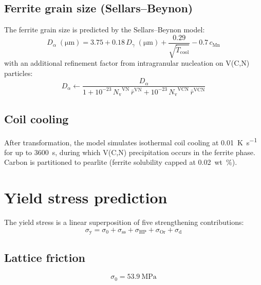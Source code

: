 \documentclass[11pt,a4paper]{article}
\newcommand{\DG}{\ensuremath{D_\gamma}}
\newcommand{\DA}{\ensuremath{D_\alpha}}
\newcommand{\sy}{\ensuremath{\sigma_\mathrm{y}}}
\newcommand{\Nv}{\ensuremath{N_\mathrm{v}}}
\begin{document}
\subsection{Ferrite grain size (Sellars--Beynon)}

The ferrite grain size is predicted by the Sellars--Beynon model:
\begin{equation}
  \DA\;(\si{\micro\metre}) = 3.75 + 0.18\,\DG\;(\si{\micro\metre})
    + \frac{0.29}{\sqrt{\dot{T}_\mathrm{cool}}}
    - 0.7\,c_\mathrm{Mn}
  \label{eq:dalpha}
\end{equation}
with an additional refinement factor from intragranular nucleation on V(C,N)
particles:
\begin{equation}
  \DA \leftarrow \frac{\DA}{1 + 10^{-23}\,\Nv^{\mathrm{VN}}\,\bar{r}^{\mathrm{VN}}
    + 10^{-23}\,\Nv^{\mathrm{VCN}}\,\bar{r}^{\mathrm{VCN}}}
  \label{eq:igr}
\end{equation}

\subsection{Coil cooling}

After transformation, the model simulates isothermal coil cooling at
\SI{0.01}{\kelvin\per\second} for up to \SI{3600}{\second}, during which
V(C,N) precipitation occurs in the ferrite phase.  Carbon is partitioned
to pearlite (ferrite solubility capped at \SI{0.02}{wt.\%}).

\section{Yield stress prediction}
\label{sec:strength}

The yield stress is a linear superposition of five strengthening contributions:
\begin{equation}
  \boxed{\;
  \sy = \sigma_0 + \sigma_\mathrm{ss} + \sigma_\mathrm{HP}
    + \sigma_\mathrm{Or} + \sigma_\mathrm{d}
  \;}
  \label{eq:sigma}
\end{equation}

\subsection{Lattice friction}

\begin{equation}
  \sigma_0 = \SI{53.9}{\mega\pascal}
\end{equation}
\end{document}
